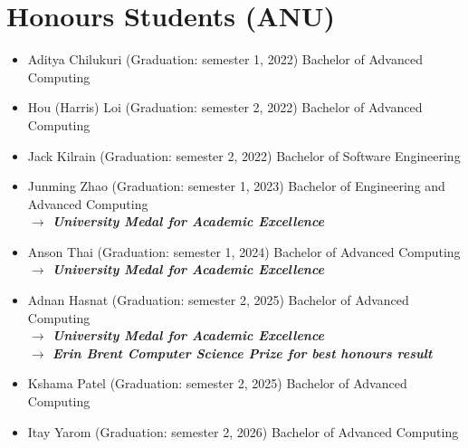 \documentclass[11pt,a4paper,sans]{moderncv}
\begin{document}
\section{Honours Students (ANU)}
{\small
\begin{itemize}
\item Aditya Chilukuri (Graduation: semester 1, 2022) Bachelor of Advanced Computing 
\item Hou (Harris) Loi (Graduation: semester 2, 2022) Bachelor of Advanced Computing 
\item Jack Kilrain (Graduation: semester 2, 2022) Bachelor of Software Engineering 
\item Junming Zhao (Graduation: semester 1, 2023) Bachelor of Engineering and Advanced Computing \\ \textcolor{BrickRed}{\textbf{$\longrightarrow$ \emph{University Medal for Academic Excellence}}}
\item Anson Thai (Graduation: semester 1, 2024) Bachelor of Advanced Computing \\ \textcolor{BrickRed}{\textbf{$\longrightarrow$ \emph{University Medal for Academic Excellence}}}
\item Adnan Hasnat (Graduation: semester 2, 2025) Bachelor of Advanced Computing \\ \textcolor{BrickRed}{\textbf{$\longrightarrow$ \emph{University Medal for Academic Excellence}}} \\ \textcolor{BrickRed}{\textbf{$\longrightarrow$ \emph{Erin Brent Computer Science Prize for best honours result}}}
\item Kshama Patel (Graduation: semester 2, 2025) Bachelor of Advanced Computing
\item Itay Yarom (Graduation: semester 2, 2026) Bachelor of Advanced Computing
\end{itemize}
}
\end{document}
